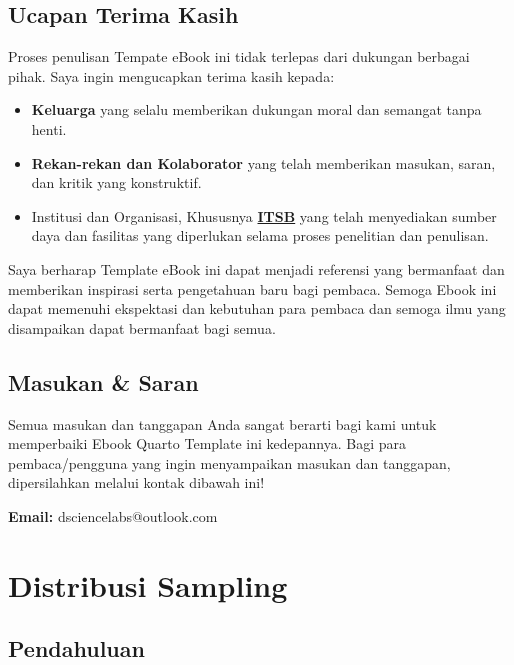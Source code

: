 \documentclass[
  indonesian,
  letterpaper,
]{book}
\providecommand{\tightlist}{%
  \setlength{\itemsep}{0pt}\setlength{\parskip}{0pt}}
\begin{document}
\section*{Ucapan Terima Kasih}\label{ucapan-terima-kasih}


Proses penulisan Tempate eBook ini tidak terlepas dari dukungan berbagai
pihak. Saya ingin mengucapkan terima kasih kepada:

\begin{itemize}
\tightlist
\item
  \textbf{Keluarga} yang selalu memberikan dukungan moral dan semangat
  tanpa henti.
\item
  \textbf{Rekan-rekan dan Kolaborator} yang telah memberikan masukan,
  saran, dan kritik yang konstruktif.
\item
  Institusi dan Organisasi, Khususnya
  \textbf{\href{https://itsb.ac.id/}{ITSB}} yang telah menyediakan
  sumber daya dan fasilitas yang diperlukan selama proses penelitian dan
  penulisan.
\end{itemize}

Saya berharap Template eBook ini dapat menjadi referensi yang bermanfaat
dan memberikan inspirasi serta pengetahuan baru bagi pembaca. Semoga
Ebook ini dapat memenuhi ekspektasi dan kebutuhan para pembaca dan
semoga ilmu yang disampaikan dapat bermanfaat bagi semua.

\section*{Masukan \& Saran}\label{masukan-saran}


Semua masukan dan tanggapan Anda sangat berarti bagi kami untuk
memperbaiki Ebook Quarto Template ini kedepannya. Bagi para
pembaca/pengguna yang ingin menyampaikan masukan dan tanggapan,
dipersilahkan melalui kontak dibawah ini!

\textbf{Email:} dsciencelabs@outlook.com


\chapter{Distribusi Sampling}\label{distribusi-sampling}

\section{Pendahuluan}\label{pendahuluan}
\end{document}
